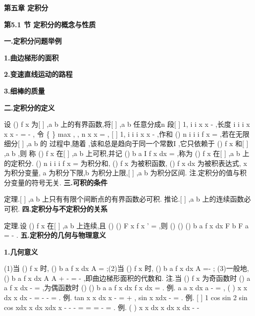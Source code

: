 \begin{center}
{\Large \bfseries \textcolor{lyred}{第五章 定积分}}
\end{center}

\vspace{6pt}
{\large \bfseries \textcolor{lyred}{第5.1 节 定积分的概念与性质}}

\vspace{4pt}
{\bfseries \textcolor{lyred}{一.定积分问题举例}}

{\bfseries \textcolor{lyred}{1.曲边梯形的面积}}

{\bfseries \textcolor{lyred}{2.变速直线运动的路程}}

{\bfseries \textcolor{lyred}{3.细棒的质量}}

\vspace{4pt}
{\bfseries \textcolor{lyred}{二.定积分的定义}}

设
()
f x 为[
]
,a b 上的有界函数,将[
]
,a b 任意分成n 段[
]
1,
i
i
x
x
-
,长度
i
i
i
x
x
x
\Delta 
-
=
-
, 
令
\{
\}
max
,
,
n
x
x
\lambda =
\Delta 
\Delta 
\Lambda 
,
[
]
1,
i
i
i
x
x
\psi 
-
\forall 
\in 
,作和
()
n
i
i
i
f
x
\psi 
=
\Delta 
\sum 
,若在无限细分[
]
,a b 的 
过程中,随着
\lambda \to 
,该和总是趋向于同一个常数I ,它只依赖于
()
f x 和[
]
,a b ,则 
称
()
f x 在[
]
,a b 上\textcolor{lyred}{可积},并记
()
b
a
I
f x dx
=\int 
,称为
()
f x 在[
]
,a b 上的\textcolor{lyred}{定积分}. 
()
n
i
i
i
f
x
\psi 
=
\Delta 
\sum 
为\textcolor{lyred}{积分和},
()
f x 为\textcolor{lyred}{被积函数},
()
f x dx 为\textcolor{lyred}{被积表达式}, x 为\textcolor{lyred}{积分变量}, 
a 为\textcolor{lyred}{积分下限},b 为\textcolor{lyred}{积分上限},[
]
,a b 为\textcolor{lyred}{积分区间}. 
\textcolor{lyred}{注}.定积分的值与积分变量的符号无关. 
\vspace{4pt}
{\bfseries \textcolor{lyred}{三.可积的条件}}

\textcolor{lyred}{定理}.[
]
,a b 上只有有限个间断点的有界函数必可积. 
\textcolor{lyred}{推论}.[
]
,a b 上的连续函数必可积. 
\vspace{4pt}
{\bfseries \textcolor{lyred}{四.定积分与不定积分的关系}}

\textcolor{lyred}{定理}.设
()
f x 在[
]
,a b 上连续,且
()
()
F
x
f x
'
=
,则
()
()
()
b
a
f x dx
F b
F a
=
-
\int 
. 
\vspace{4pt}
{\bfseries \textcolor{lyred}{五.定积分的几何与物理意义}}

{\bfseries \textcolor{lyred}{1.几何意义}}

(1)当
()
f x \ge 
时,
()
b
a
f x dx
A
=
\int 
;(2)当
()
f x \le 
时,
()
b
a
f x dx
A
=-
\int 
; 
(3)一般地,
()
b
a
f x dx
A
A
+
-
=
-
\int 
,即曲边梯形面积的代数和. 
\textcolor{lyred}{注}.当
()
f x 为奇函数时
()
a
a
f x dx
-
=
\int 
,为偶函数时
()
()
b
a
a
f x dx
f x dx
=
\int 
\int 
. 
\textcolor{lyred}{例}.
a
a
x dx
a
\pi 
-
=
\int 
,
(
)
x
x dx
x
dx
\pi 
-
=
-
-
=
\int 
\int 
. 
\textcolor{lyred}{例}.
tan
x
x dx
x
-
=
+
\int 
,
sin
x
xdx
-
=
\int 
. 
\textcolor{lyred}{例}.
[
]
1 cos
sin
2 sin
cos
xdx
x dx
xdx
x
\pi 
\pi 
\pi 
\pi 
\pi 
\pi 
-
-
-
=
=
=
-
=
\int 
\int 
\int 
. 
\textcolor{lyred}{例}. (
)
x
x
dx
x dx
x dx
-
-


